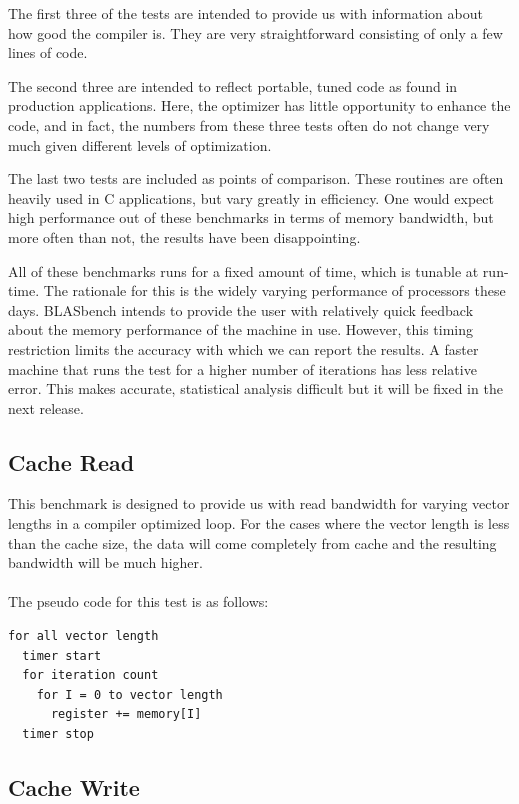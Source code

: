 \documentclass [12pt]{article}
\begin{document}
The first three of the tests are intended to provide us with
information about how good the compiler is. They are very
straightforward consisting of only a few lines of code.  

The second
three are intended to reflect portable, tuned code as found in
production applications. Here, the optimizer has little opportunity to
enhance the code, and in fact, the numbers from these three tests
often do not change very much given different levels of optimization.

The last two tests are included as points of comparison. These
routines are often heavily used in C applications, but vary greatly in
efficiency. One would expect high performance out of these benchmarks
in terms of memory bandwidth, but more often than not, the results
have been disappointing.

All of these benchmarks runs for a fixed amount of time, which is
tunable at run-time. The rationale for this is the widely varying
performance of processors these days. BLASbench intends to
provide the user with relatively quick feedback about the memory performance
of the machine in use. However, this timing restriction limits the accuracy with which
we can report the results. A faster machine that runs the test for a higher
number of iterations has less relative error. This makes accurate, statistical
analysis difficult but it will be fixed in the next release.

\subsection{Cache Read}

This benchmark is designed to provide us with read bandwidth for
varying vector lengths in a compiler optimized loop. For the cases
where the vector length is less than the cache size, the data will 
come completely from cache and the resulting bandwidth will be much higher.
\\ \ \\
The pseudo code for this test is as follows:

\begin{verbatim}
for all vector length
  timer start
  for iteration count
    for I = 0 to vector length
      register += memory[I] 
  timer stop
\end{verbatim}

\subsection{Cache Write}
\end{document}
